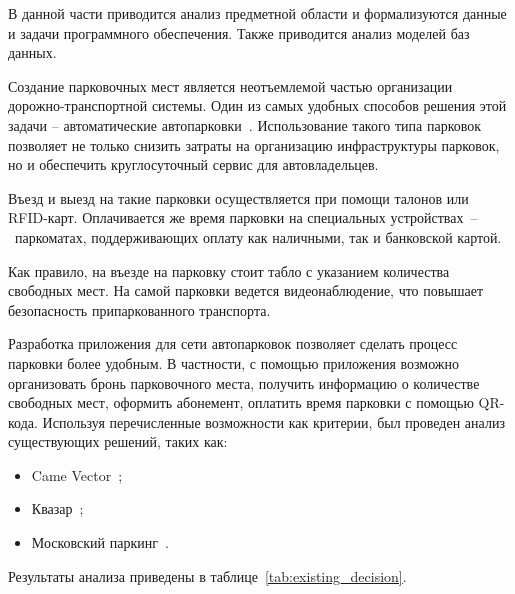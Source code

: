 \label{cha:A}
В данной части приводится анализ предметной области и формализуются данные и задачи программного обеспечения. Также приводится анализ моделей баз данных.

Создание парковочных мест является неотъемлемой частью организации дорожно-транспортной системы. 
Один из самых удобных способов решения этой задачи -- автоматические автопарковки~\cite{actual_autoparking}.
Использование такого типа парковок позволяет не только снизить затраты на организацию инфраструктуры парковок, но и обеспечить круглосуточный сервис для автовладельцев.

Въезд и выезд на такие парковки осуществляется при помощи талонов или  RFID-карт. Оплачивается же время парковки на специальных устройствах~--~паркоматах, поддерживающих оплату как наличными, так и банковской картой.

Как правило, на въезде на парковку стоит табло с указанием количества свободных мест. На самой парковки ведется видеонаблюдение, что повышает безопасность припаркованного транспорта.

Разработка приложения для сети автопарковок позволяет сделать процесс парковки более удобным.
В частности, с помощью приложения возможно организовать бронь парковочного места, получить информацию о количестве свободных мест, оформить абонемент, оплатить время парковки с помощью QR-кода.
Используя перечисленные возможности как критерии, был проведен анализ существующих решений, таких как: 
\begin{itemize}
	\item Came Vector~\cite{came_vector};
	\item Квазар~\cite{kvazar};
	\item Московский паркинг~\cite{parking_Moscow}.
\end{itemize}
Результаты анализа приведены в таблице~\ref{tab:existing_decision}.

